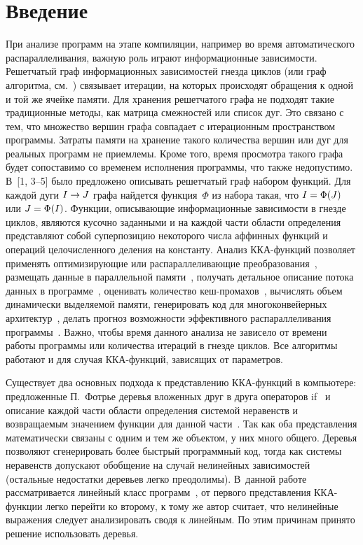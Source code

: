       \begin{multicols}{2}

            \label{st\stat}


\section{Введение}

При анализе программ на этапе компиляции, например во время
автоматического распараллеливания, важную роль играют информационные
зависимости. Решетчатый граф информационных зависимостей гнезда
циклов (или граф алгоритма, см.~\cite{Voevodin, ShteinbBYa0})
связывает итерации, на которых происходят обращения к одной и той же
ячейке памяти. Для хранения решетчатого графа не подходят такие
традиционные методы, как матрица смежностей или список дуг. Это
связано с тем, что множество вершин графа совпадает с итерационным
пространством программы. Затраты памяти на хранение такого
количества вершин или дуг для реальных программ не приемлемы. Кроме
того, время просмотра такого графа будет сопоставимо со временем
исполнения программы, что также недопустимо. В~[1, 3--5]
было предложено описывать решетчатый граф набором функций. Для
каждой дуги $I\hm\to J$ графа найдется функция~$\Phi$ из набора такая,
что $I\hm=\Phi(J)$ или $J\hm=\Phi(I)$. Функции, описывающие информационные
зависимости в гнезде циклов, являются кусочно заданными и на каждой
части области определения представляют собой суперпозицию некоторого
числа аффинных функций и операций целочисленного деления на
константу. Анализ ККА-функ\-ций позволяет применять оптимизирующие или
распараллеливающие преобразования~\cite{ShteinbBYa0, Shulj2, Shulj1}, размещать
данные в параллельной памяти~\cite{ShteinbBYa}, получать детальное
описание потока данных в программе~\cite{Feautrier1, Klimov}, оценивать количество
кеш-про\-ма\-хов~\cite{Verdoolaege3}, вычислять объем динамически
выделяемой памяти, генерировать код для многоконвейерных архитектур~\cite{ShteinbR}, 
делать прогноз возможности эффективного
распараллеливания программы~\cite{KritichPut}. Важно, чтобы время
данного анализа не зависело от времени работы программы или
количества итераций в гнезде циклов. Все алгоритмы работают и для
случая ККА-функ\-ций, зависящих от параметров.

Существует два основных подхода к представлению ККА-функ\-ций в
компьютере: предложенные П.~Фотрье деревья вложенных друг в друга
операторов if~\cite{Feautrier2} и описание каждой части области
определения системой неравенств и возвращаемым значением функции для
данной части~\cite{Voevodin, Pugh, Maslov}.
Так как оба представления математически связаны с одним и тем же
объектом, у них много общего. Деревья позволяют сгенерировать более
быстрый программный код, тогда как системы неравенств допускают
обобщение на случай нелинейных зависимостей~\cite{Maslov}
(остальные недостатки деревьев легко преодолимы). В~данной работе
рассматривается линейный класс программ~\cite{Feautrier2}, от
первого пред\-став\-ле\-ния ККА-функ\-ции легко перейти ко второму, к тому
же автор считает, что нелинейные выражения следует анализировать
сводя к линейным. По этим причинам принято решение использовать
деревья.


\end{multicols}
